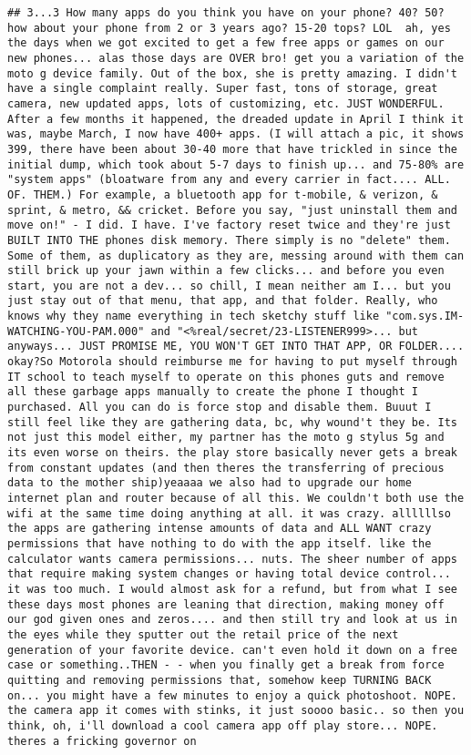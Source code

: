 \documentclass[
  11pt,
]{article}
\begin{document}
\begin{verbatim}
## 3...3 How many apps do you think you have on your phone? 40? 50? how about your phone from 2 or 3 years ago? 15-20 tops? LOL  ah, yes the days when we got excited to get a few free apps or games on our new phones... alas those days are OVER bro! get you a variation of the moto g device family. Out of the box, she is pretty amazing. I didn't have a single complaint really. Super fast, tons of storage, great camera, new updated apps, lots of customizing, etc. JUST WONDERFUL. After a few months it happened, the dreaded update in April I think it was, maybe March, I now have 400+ apps. (I will attach a pic, it shows 399, there have been about 30-40 more that have trickled in since the initial dump, which took about 5-7 days to finish up... and 75-80% are "system apps" (bloatware from any and every carrier in fact.... ALL. OF. THEM.) For example, a bluetooth app for t-mobile, & verizon, & sprint, & metro, && cricket. Before you say, "just uninstall them and move on!" - I did. I have. I've factory reset twice and they're just BUILT INTO THE phones disk memory. There simply is no "delete" them. Some of them, as duplicatory as they are, messing around with them can still brick up your jawn within a few clicks... and before you even start, you are not a dev... so chill, I mean neither am I... but you just stay out of that menu, that app, and that folder. Really, who knows why they name everything in tech sketchy stuff like "com.sys.IM-WATCHING-YOU-PAM.000" and "<%real/secret/23-LISTENER999>... but anyways... JUST PROMISE ME, YOU WON'T GET INTO THAT APP, OR FOLDER.... okay?So Motorola should reimburse me for having to put myself through IT school to teach myself to operate on this phones guts and remove all these garbage apps manually to create the phone I thought I purchased. All you can do is force stop and disable them. Buuut I still feel like they are gathering data, bc, why wound't they be. Its not just this model either, my partner has the moto g stylus 5g and its even worse on theirs. the play store basically never gets a break from constant updates (and then theres the transferring of precious data to the mother ship)yeaaaa we also had to upgrade our home internet plan and router because of all this. We couldn't both use the wifi at the same time doing anything at all. it was crazy. allllllso the apps are gathering intense amounts of data and ALL WANT crazy permissions that have nothing to do with the app itself. like the calculator wants camera permissions... nuts. The sheer number of apps that require making system changes or having total device control... it was too much. I would almost ask for a refund, but from what I see these days most phones are leaning that direction, making money off our god given ones and zeros.... and then still try and look at us in the eyes while they sputter out the retail price of the next generation of your favorite device. can't even hold it down on a free case or something..THEN - - when you finally get a break from force quitting and removing permissions that, somehow keep TURNING BACK on... you might have a few minutes to enjoy a quick photoshoot. NOPE. the camera app it comes with stinks, it just soooo basic.. so then you think, oh, i'll download a cool camera app off play store... NOPE. theres a fricking governor on 
\end{verbatim}
\end{document}
